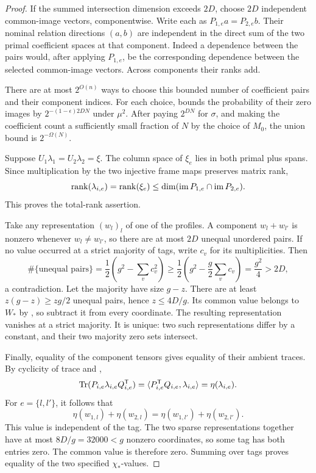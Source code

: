 \begin{proof}
If the summed intersection dimension exceeds \(2D\), choose \(2D\) independent common-image vectors, componentwise.
Write each as \(P_{1,e}a=P_{2,e}b\).
Their nominal relation directions \((a,b)\) are independent in the direct sum of the two primal coefficient spaces at that component.
Indeed a dependence between the pairs would, after applying \(P_{1,e}\), be the corresponding dependence between the selected common-image vectors.
Across components their ranks add.

There are at most \(2^{O(n)}\) ways to choose this bounded number of coefficient pairs and their component indices.
For each choice,  bounds the probability of their zero images by \(2^{-(1-\epsilon)2DN}\) under \(\mu^2\).
After paying \(2^{DN}\) for \(\sigma\), and making the coefficient count a sufficiently small fraction of \(N\) by the choice of \(M_0\), the union bound is \(2^{-\Omega(N)}\).

Suppose \(U_1\lambda_1=U_2\lambda_2=\xi\).
The column space of \(\xi_e\) lies in both primal plus spans.
Since multiplication by the two injective frame maps preserves matrix rank,
\[
 \operatorname{rank}(\lambda_{i,e})=\operatorname{rank}(\xi_e)
 \le\dim(\operatorname{im} P_{1,e}\cap\operatorname{im} P_{2,e}).
\]
This proves the total-rank assertion.

Take any representation \((w_l)_l\) of one of the profiles.
A component \(w_l+w_{l'}\) is nonzero whenever \(w_l\ne w_{l'}\), so there are at most \(2D\) unequal unordered pairs.
If no value occurred at a strict majority of tags, write \(c_v\) for its multiplicities.
Then
\[
 \#\{\text{unequal pairs}\}
 =\frac12\left(g^2-\sum_vc_v^2\right)
 \ge\frac12\left(g^2-\frac g2\sum_vc_v\right)
 =\frac{g^2}{4}>2D,
\]
a contradiction.
Let the majority have size \(g-z\).
There are at least \(z(g-z)\ge zg/2\) unequal pairs, hence \(z\le4D/g\).
Its common value belongs to \(W_*\) by , so subtract it from every coordinate.
The resulting representation vanishes at a strict majority.
It is unique: two such representations differ by a constant, and their two majority zero sets intersect.

Finally, equality of the component tensors gives equality of their ambient traces.
By cyclicity of trace and ,
\[
 \operatorname{Tr}(P_{i,e}\lambda_{i,e}Q_{i,e}^{\mathsf T})
 =\langle P_{i,e}^{\mathsf T} Q_{i,e},\lambda_{i,e}\rangle
 =\eta(\lambda_{i,e}).
\]
For \(e=\{l,l'\}\), it follows that
\[
 \eta(w_{1,l})+\eta(w_{2,l})
 =\eta(w_{1,l'})+\eta(w_{2,l'}).
\]
This value is independent of the tag.
The two sparse representations together have at most \(8D/g=32000<g\) nonzero coordinates, so some tag has both entries zero.
The common value is therefore zero.
Summing over tags proves equality of the two specified \(\chi_*\)-values.
\end{proof}

